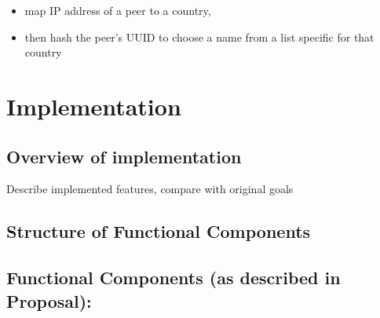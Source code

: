 \documentclass[12pt,a4paper,]{adreport}
\begin{document}
\begin{itemize}
  \begin{itemize}
  \itemsep1pt\parskip0pt
  \item
    map IP address of a peer to a country,
  \item
    then hash the peer's UUID to choose a name from a list specific for
    that country
  \end{itemize}
\end{itemize}

\chapter{Implementation}\label{implementation}

\section{Overview of implementation}\label{overview-of-implementation}

Describe implemented features, compare with original goals

\section{Structure of Functional
Components}\label{structure-of-functional-components}

\section{Functional Components (as described in
Proposal):}\label{functional-components-as-described-in-proposal}
\end{document}
